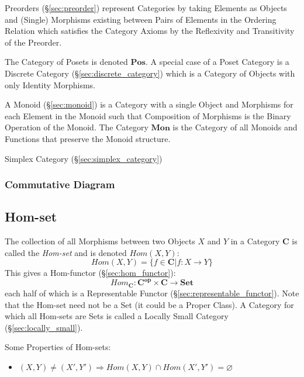 Preorders (\S\ref{sec:preorder}) represent Categories by taking
Elements as Objects and (Single) Morphisms existing between Pairs of
Elements in the Ordering Relation which satisfies the Category Axioms
by the Reflexivity and Transitivity of the Preorder.

The Category of Posets is denoted $\mathbf{Pos}$. A special case of a
Poset Category is a Discrete Category (\S\ref{sec:discrete_category})
which is a Category of Objects with only Identity Morphisms.

A Monoid (\S\ref{sec:monoid}) is a Category with a single Object and
Morphisms for each Element in the Monoid such that Composition of
Morphisms is the Binary Operation of the Monoid. The Category
$\mathbf{Mon}$ is the Category of all Monoids and Functions that
preserve the Monoid structure.

Simplex Category (\S\ref{sec:simplex_category})



\subsubsection{Commutative Diagram}\label{sec:commutative_diagram}

\subsection{Hom-set}\label{sec:hom_set}

The collection of all Morphisms between two Objects $X$ and $Y$ in a
Category $\mathbf{C}$ is called the \emph{Hom-set} and is denoted
$Hom(X,Y)$:
\[
  Hom(X,Y) = \{f \in \mathbf{C} | f : X \rightarrow Y\}
\]
This gives a Hom-functor (\S\ref{sec:hom_functor}):
\[
  Hom_\mathbf{C} : \mathbf{C^{op}} \times \mathbf{C} \rightarrow \mathbf{Set}
\]
each half of which is a Representable Functor
(\S\ref{sec:representable_functor}).
\newline
\HandRight\; Note that the Hom-set need not be a Set (it could be a
Proper Class). A Category for which all Hom-sets are Sets is called a
Locally Small Category (\S\ref{sec:locally_small}).

Some Properties of Hom-sets:
\begin{itemize}
\item $ (X,Y) \neq (X',Y') \Rightarrow
  Hom(X,Y) \cap Hom(X',Y') = \varnothing$
\end{itemize}

